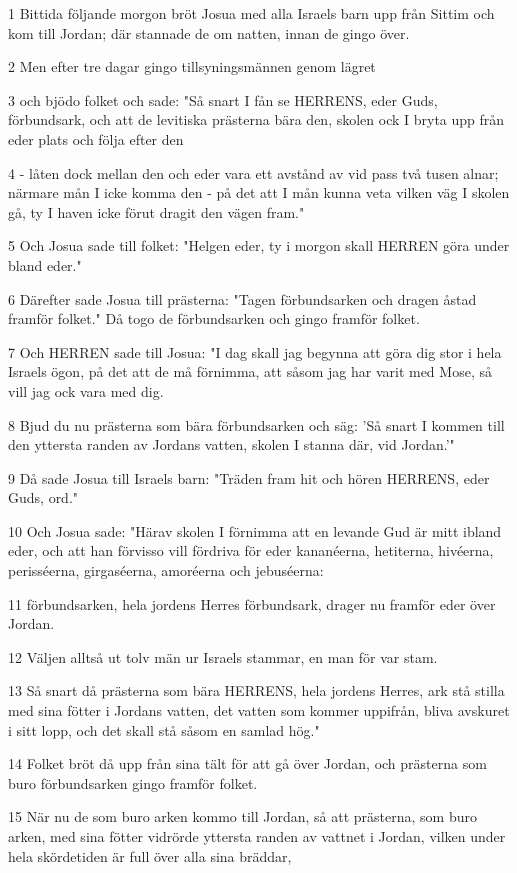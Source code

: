 \par 1 Bittida följande morgon bröt Josua med alla Israels barn upp från Sittim och kom till Jordan; där stannade de om natten, innan de gingo över.
\par 2 Men efter tre dagar gingo tillsyningsmännen genom lägret
\par 3 och bjödo folket och sade: "Så snart I fån se HERRENS, eder Guds, förbundsark, och att de levitiska prästerna bära den, skolen ock I bryta upp från eder plats och följa efter den
\par 4 - låten dock mellan den och eder vara ett avstånd av vid pass två tusen alnar; närmare mån I icke komma den - på det att I mån kunna veta vilken väg I skolen gå, ty I haven icke förut dragit den vägen fram."
\par 5 Och Josua sade till folket: "Helgen eder, ty i morgon skall HERREN göra under bland eder."
\par 6 Därefter sade Josua till prästerna: "Tagen förbundsarken och dragen åstad framför folket." Då togo de förbundsarken och gingo framför folket.
\par 7 Och HERREN sade till Josua: "I dag skall jag begynna att göra dig stor i hela Israels ögon, på det att de må förnimma, att såsom jag har varit med Mose, så vill jag ock vara med dig.
\par 8 Bjud du nu prästerna som bära förbundsarken och säg: 'Så snart I kommen till den yttersta randen av Jordans vatten, skolen I stanna där, vid Jordan.'"
\par 9 Då sade Josua till Israels barn: "Träden fram hit och hören HERRENS, eder Guds, ord."
\par 10 Och Josua sade: "Härav skolen I förnimma att en levande Gud är mitt ibland eder, och att han förvisso vill fördriva för eder kananéerna, hetiterna, hivéerna, perisséerna, girgaséerna, amoréerna och jebuséerna:
\par 11 förbundsarken, hela jordens Herres förbundsark, drager nu framför eder över Jordan.
\par 12 Väljen alltså ut tolv män ur Israels stammar, en man för var stam.
\par 13 Så snart då prästerna som bära HERRENS, hela jordens Herres, ark stå stilla med sina fötter i Jordans vatten, det vatten som kommer uppifrån, bliva avskuret i sitt lopp, och det skall stå såsom en samlad hög."
\par 14 Folket bröt då upp från sina tält för att gå över Jordan, och prästerna som buro förbundsarken gingo framför folket.
\par 15 När nu de som buro arken kommo till Jordan, så att prästerna, som buro arken, med sina fötter vidrörde yttersta randen av vattnet i Jordan, vilken under hela skördetiden är full över alla sina bräddar,
